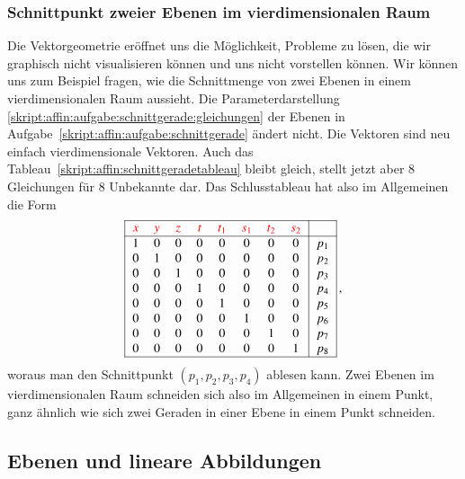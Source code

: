 \subsubsection{Schnittpunkt zweier Ebenen im vierdimensionalen Raum}
Die Vektorgeometrie eröffnet uns die Möglichkeit, Probleme zu lösen,
die wir graphisch nicht visualisieren können und uns nicht vorstellen
können.
Wir können uns zum Beispiel fragen, wie die Schnittmenge von zwei Ebenen
in einem vierdimensionalen Raum aussieht.
Die Parameterdarstellung
\eqref{skript:affin:aufgabe:schnittgerade:gleichungen}
der Ebenen
in Aufgabe~\ref{skript:affin:aufgabe:schnittgerade}
ändert nicht.
Die Vektoren sind neu einfach vierdimensionale Vektoren.
Auch das Tableau~\eqref{skript:affin:schnittgeradetableau} bleibt gleich,
stellt jetzt aber 8 Gleichungen für 8 Unbekannte dar.
Das Schlusstableau hat also im Allgemeinen die Form
\[
\begin{tabular}{|
>{$}c<{$}
>{$}c<{$}
>{$}c<{$}
>{$}c<{$}
>{$}c<{$}
>{$}c<{$}
>{$}c<{$}
>{$}c<{$}|
>{$}c<{$}|}
\hline
\color{red}x&
\color{red}y&
\color{red}z&
\color{red}t&
\color{red}t_1&
\color{red}s_1&
\color{red}t_2&
\color{red}s_2&
\\
\hline
1&0&0&0&0&0&0&0&p_1\\
0&1&0&0&0&0&0&0&p_2\\
0&0&1&0&0&0&0&0&p_3\\
0&0&0&1&0&0&0&0&p_4\\
0&0&0&0&1&0&0&0&p_5\\
0&0&0&0&0&1&0&0&p_6\\
0&0&0&0&0&0&1&0&p_7\\
0&0&0&0&0&0&0&1&p_8\\
\hline
\end{tabular}\,,
\]
woraus man den Schnittpunkt  $(p_1,p_2,p_3,p_4)$ ablesen kann.
Zwei Ebenen im vierdimensionalen Raum schneiden sich also im Allgemeinen
in einem Punkt, ganz ähnlich wie sich zwei Geraden in einer Ebene in
einem Punkt schneiden.

\subsection{Ebenen und lineare Abbildungen}
